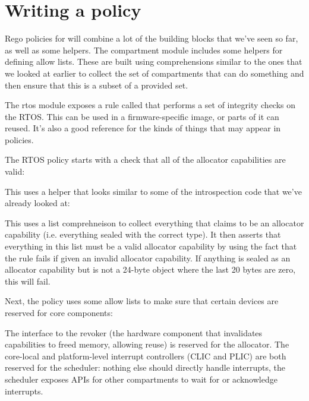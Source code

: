 {\section{Writing a policy}

Rego policies for  will combine a lot of the building blocks that we've seen so far, as well as some helpers.
The compartment module includes some helpers for defining allow lists.
These are built using comprehensions similar to the ones that we looked at earlier to collect the set of compartments that can do something and then ensure that this is a subset of a provided set.

The rtos module exposes a rule called  that performs a set of integrity checks on the RTOS.
This can be used in a firmware-specific image, or parts of it can reused.
It's also a good reference for the kinds of things that may appear in policies.

The RTOS policy starts with a check that all of the allocator capabilities are valid:

\regolisting[filename=examples/auditing-rtos/rtos.rego,marker=allsealedvalid,label=lst:allsealedvalid,caption="The Rego expression checking that all sealed allocator capabilities are valid"]{}

This uses a helper that looks similar to some of the introspection code that we've already looked at:

\regolisting[filename=examples/auditing-rtos/rtos.rego,marker=allsealedvalidimpl,label=lst:allsealedvalidimpl,caption="The Rego rule implementing the check that all sealed allocator capabilities are valid"]{}

This uses a list comprehneison to collect everything that claims to be an allocator capability (i.e. everything sealed with the correct type).
It then asserts that everything in this list must be a valid allocator capability by using the fact that the  rule fails if given an invalid allocator capability.
If anything is sealed as an allocator capability but is not a 24-byte object where the last 20 bytes are zero, this will fail.

Next, the policy uses some allow lists to make sure that certain devices are reserved for core components:

\regolisting[filename=examples/auditing-rtos/rtos.rego,marker=allowlists,label=lst:allowlists,caption="The compartment allow lists in the RTOS policy"]{}

The interface to the revoker (the hardware component that invalidates capabilities to freed memory, allowing reuse) is reserved for the allocator.
The core-local and platform-level interrupt controllers (CLIC and PLIC) are both reserved for the scheduler: nothing else should directly handle interrupts, the scheduler exposes APIs for other compartments to wait for or acknowledge interrupts.

}
